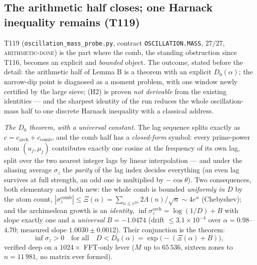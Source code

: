 \documentclass[11pt,a4paper]{article}
\begin{document}
\subsection{The arithmetic half closes; one Harnack inequality remains (T119)}
T119 (\texttt{oscillation\_mass\_probe.py}, contract \texttt{OSCILLATION.MASS}, $27/27$,
\textsc{arithmetic-done}) is the part where the comb, the standing obstruction since T116,
becomes an explicit and \emph{bounded} object. The outcome, stated before the detail: the
arithmetic half of Lemma B is a theorem with an explicit $D_0(\alpha)$; the narrow-dip point is
diagnosed as a moment problem, with one window newly certified by the large sieve; (H2) is
proven \emph{not derivable} from the existing identities --- and the sharpest identity of the
run reduces the whole oscillation-mass half to one discrete Harnack inequality with a
classical address.

\emph{The $D_0$ theorem, with a universal constant.} The lag sequence splits exactly as
$c=c_{\mathrm{arch}}+c_{\mathrm{comb}}$, and the comb half has a \emph{closed-form} symbol:
every prime-power atom $(u_j,\mu_j)$ contributes exactly one cosine at the frequency of its
own lag, split over the two nearest integer lags by linear interpolation --- and under the
aliasing average $\sigma_z$ the \emph{parity} of the lag index decides everything (an even lag
survives at full strength, an odd one is multiplied by $-\cos\theta$). Two consequences, both
elementary and both new: the whole comb is bounded \emph{uniformly in $D$} by the atom count,
$|\sigma_z^{\mathrm{comb}}|\le\Xi(\alpha)=\sum_{n\le e^{2\alpha}}2\Lambda(n)/\sqrt n\sim
4e^{\alpha}$ (Chebyshev); and the archimedean growth is an \emph{identity},
$\inf\sigma_z^{\mathrm{arch}}=\log(1/D)+B$ with slope exactly one and a \emph{universal}
$B=-1.0474$ (drift $\le3.1\times10^{-4}$ over $\alpha=0.98$--$4.70$; measured slope
$1.0030\pm0.0012$). Their conjunction is the theorem:
\[
\inf\sigma_z>0\quad\text{for all}\quad D<D_0(\alpha)=\exp\!\big(-(\Xi(\alpha)+B)\big),
\]
verified deep on a $1024\times$ FFT-only lever ($M$ up to $65\,536$, sixteen zones to
$n=11\,981$, no matrix ever formed).
\end{document}
